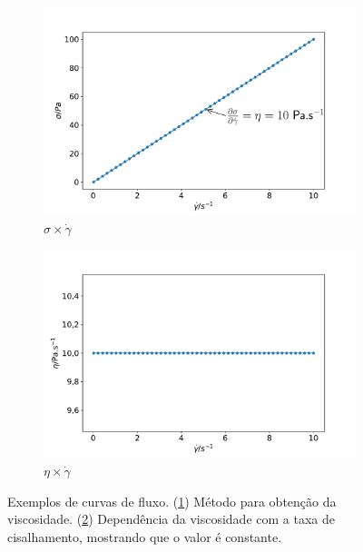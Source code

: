 			\begin{figure}[h]
				\begin{subfigure}[t]{.5\textwidth}
					\includegraphics[width=\textwidth]{./imagens/reologia/newtoniano_exemplo_tauGP}
					\caption{\(\sigma \times \dot{\gamma}\)}
					\label{fig:reol_newt_tauGP}
				\end{subfigure}%
				\begin{subfigure}[t]{.5\textwidth}
					\includegraphics[width=\textwidth]{./imagens/reologia/newtoniano_exemplo_etaGP}
					\caption{\(\eta \times \dot{\gamma}\)}
					\label{fig:reol_newt_etaGP}
				\end{subfigure}
				\caption{Exemplos de curvas de fluxo. (\ref{fig:reol_newt_tauGP}) Método para obtenção da viscosidade. (\ref{fig:reol_newt_etaGP}) Dependência da viscosidade com a taxa de cisalhamento, mostrando que o valor é constante.}
				\label{fig:reol_newt_exemplos}
			\end{figure}
				
